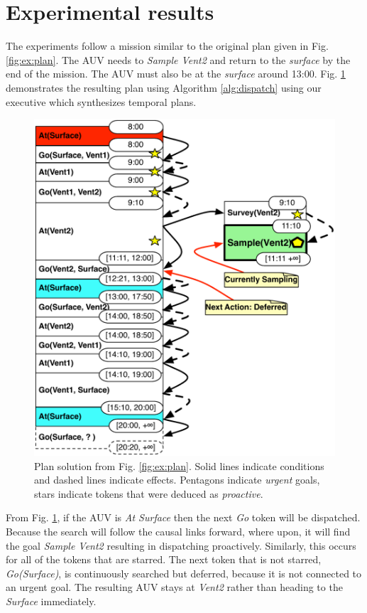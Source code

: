 \section{Experimental results}
\label{sec:exp}

The experiments follow a mission similar to the original plan given in
Fig. \ref{fig:ex:plan}. The AUV needs to {\em Sample Vent2} and return
to the {\em surface} by the end of the mission. The AUV must also be
at the {\em surface} around
13:00. %
Fig. \ref{fig:ex:mixed1} demonstrates the resulting plan using
Algorithm \ref{alg:dispatch} using our executive \rx which synthesizes
temporal plans.

\begin{figure}[!htbp]
  \centering
  \includegraphics[width=0.8\columnwidth]{figs/example_MixedInitial}
  \caption{\small Plan solution from Fig. \ref{fig:ex:plan}. Solid
    lines indicate conditions and dashed lines indicate
    effects. Pentagons indicate {\em urgent} goals, stars indicate
    tokens that were deduced as {\em proactive}.}
  \label{fig:ex:mixed1}
\end{figure}

From Fig. \ref{fig:ex:mixed1}, if the AUV is {\em At Surface} then the
next {\em Go} token will be dispatched. Because the search will follow
the causal links forward, where upon, it will find the goal {\em
  Sample Vent2} resulting in dispatching proactively.  Similarly, this
occurs for all of the tokens that are starred. The next token that is
not starred, {\em Go(Surface)}, is continuously searched but deferred,
because it is not connected to an urgent goal. The resulting AUV stays
at {\em Vent2} rather than heading to the {\em Surface} immediately.


